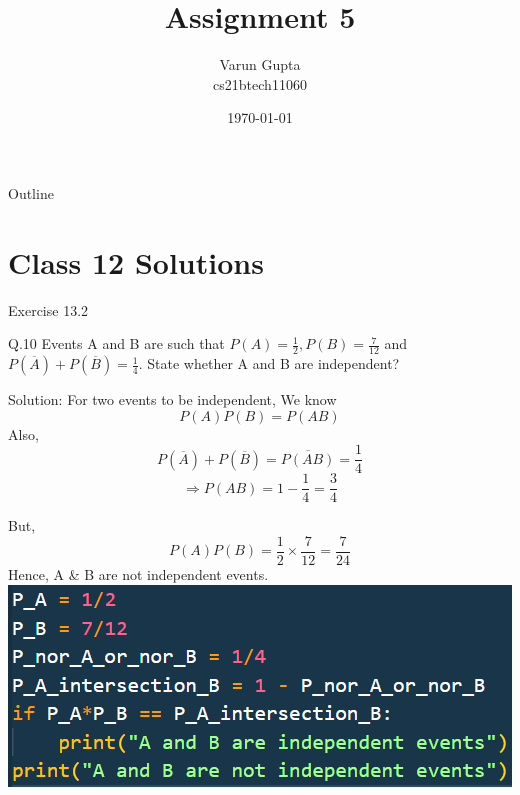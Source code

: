 \documentclass{beamer}
\title{Assignment 5}
\author{Varun Gupta \\ cs21btech11060}
\date{\today}
\begin{document}
\begin{frame}
    \titlepage 
\end{frame}

\logo{}


\begin{frame}{Outline}
    \tableofcontents
\end{frame}

\section{Class 12 Solutions}
\begin{frame}{Exercise 13.2}
    \begin{block}{Q.10}
        Events A and B are such that $P(A) = \frac{1}{2}, P(B) = \frac{7}{12}$ and $P(\overline{A}) + P(\overline{B}) = \frac{1}{4}$. State whether A and B are independent?
    \end{block}
    \begin{block}{Solution:}
        For two events to be independent, We know
        \begin{equation}
            P(A)P(B) = P(AB)
        \end{equation}
        Also,
        \begin{equation}
            P(\overline{A})+P(\overline{B}) = \overline{P(AB)} = \frac{1}{4}
        \end{equation}
        \begin{equation}
            \Rightarrow P(AB) = 1-\frac{1}{4} = \frac{3}{4}
        \end{equation}
    \end{block}
\end{frame}
\begin{frame}
        But,
        \begin{equation}
            P(A)P(B) = \frac{1}{2} \times \frac{7}{12} = \frac{7}{24}
        \end{equation}
        Hence, A \& B are not independent events.
        \includegraphics{figures/fig.png}
\end{frame}
\end{document}

